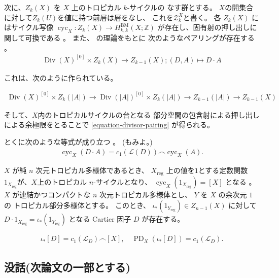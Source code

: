 \documentclass[a4paper,dvipdfmx,reqno,12pt]{amsart}
\theoremstyle{definition}
\newcommand{\opn}[1]{\operatorname{#1}}
\numberwithin{equation}{section}
\begin{document}
次に、$Z_k(X)$ を $X$ 上のトロピカル $k$-サイクルの
なす群とする\cite[Definition 3.5]{MR4637248}。
$X$の開集合に対して$Z_k(U)$を値に持つ前層は層をなし、
これを$\mathscr{Z}_k^{X}$と書く。
各 $Z_k(X)$ にはサイクル写像
$\opn{cyc}_X \colon Z_k(X)\to 
H^{\mathrm{BM}}_{k,k}(X;\mathbb{Z})$
が存在し、固有射の押し出しに関して可換である
\cite[Definition 5.4 and Corollary 5.8]{MR4637248}。
また、\cite{MR2591823} の理論をもとに
次のようなペアリングが存在する
\cite[]{MR4637248}。
\begin{align}
\label{equation-divisor-pairing}
\opn{Div}(X)^{[0]}\times Z_{k}(X)\to Z_{k-1}(X);
(D,A) \mapsto D\cdot A
\end{align}

これは、次のように作られている。




\begin{align}
\opn{Div}(X)^{[0]}\times Z_{k}(|A|) \to 
\opn{Div}(|A|)^{[0]} \times Z_{k}(|A|) \to
Z_{k-1}(|A|) \to
Z_{k-1}(X)
\end{align}

そして、$X$内のトロピカルサイクルの台となる
部分空間の包含射による押し出し
による余極限をとることで
\cref{equation-divisor-pairing} が得られる。


とくに次のような等式が成り立つ
\cite[Proposition 5.12]{MR4637248}。
(\cite[Theorem 4.15]{MR3894860}もみよ。)
\begin{align}
\opn{cyc}_X(D\cdot A)=c_1(\mathcal{L}(D))
\frown \opn{cyc}_X(A).
\end{align}

$X$ が純 $n$ 次元トロピカル多様体であるとき、
$X_{\mathrm{reg}}$ 上の値を$1$とする定数関数
$1_{X_{\mathrm{reg}}}$が、$X$上のトロピカル
$n$-サイクルとなり、
$\opn{cyc}_X(1_{X_{\mathrm{reg}}})=[X]$
となる \cite[]{MR4637248}。
$X$ が連結かつコンパクトな $n$ 次元トロピカル多様体とし、
$Y$ を $X$ の余次元 $1$ の
トロピカル部分多様体とする。
このとき、
$\iota_*(1_{Y_{\opn{reg}}})\in Z_{n-1}(X)$ に対して
$D\cdot 1_{X_{\mathrm{reg}}}=\iota_*(1_{Y_{\opn{reg}}})$
となる Cartier 因子 $D$ が存在する。

\begin{align}
\iota_*[D]=c_1(\mathcal{L}_{D})\frown [X], \quad
\opn{PD}_X(\iota_*[D])=c_1(\mathcal{L}_{D}).
\end{align}





\subsection{没話(次論文の一部とする)}
\end{document}
